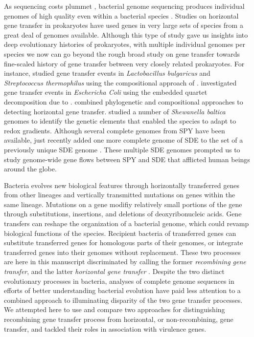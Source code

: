 \documentclass[english]{article}
\begin{document}
As sequencing costs plummet \citep{Mardis2011}, bacterial genome sequencing
produces individual genomes of high quality even within a bacterial species
\citep{Tettelin2009a}.  Studies on horizontal gene transfer in prokaryotes have
used genes in very large sets of species \citep{Koonin2001} from a great deal of
genomes available.  Although this type of study gave us insights into deep
evolutionary histories of prokaryotes, with multiple individual genomes per
species we now can go beyond the rough broad study on gene transfer towards
fine-scaled history of gene transfer between very closely related prokaryotes.
For instance, \citet{Liu2009} studied gene transfer events in
\textit{Lactobacillus bulgaricus} and \textit{Streptococcus thermophilus} using
the compositional approach of \citet{Karlin2001}. \citet{Luo2011} investigated
gene transfer events in \textit{Eschericha Coli} using the embedded quartet
decomposition due to \citet{Zhaxybayeva2006}.  \citet{Hamady2006} combined
phylogenetic and compositional approaches to detecting horizontal gene transfer.
\citet{Caro-Quintero2011} studied a number of \textit{Shewanella baltica}
genomes to identify the genetic elements that enabled the species to adapt to
redox gradients.  Although several complete genomes from SPY have been
available, \citet{Suzuki2011} just recently added one more complete genome of
SDE to the set of a previously unique SDE genome \citep{Shimomura2011}. These
multiple SDE genomes prompted us to study genome-wide gene flows between SPY and
SDE that afflicted human beings around the globe.

Bacteria evolves new biological features through horizontally transferred genes
from other lineages and vertically transmitted mutations on genes within the
same lineage.  Mutations on a gene modifiy relatively small portions of the gene
through substitutions, insertions, and deletions of deoxyribonucleic acids.
Gene transfers can reshape the organization of a bacterial genome,
which could revamp biological functions of the species.  Recipient bacteria of
transferred genes can substitute transferred genes for homologous parts of their
genomes, or integrate transferred genes into their genomes without replacement.
These two processes are here in this manuscript discriminated by calling the
former \textit{recombining gene transfer}, and the latter \textit{horizontal
gene transfer} \citep{Ochman2001,Lawrence2009}.  Despite the two distinct
evolutionary processes in bacteria, analyses of complete genome sequences in
efforts of better understanding bacterial evolution have paid less attention to
a combined approach to illuminating disparity of the two gene transfer
processes. We attempted here to use and compare two approaches for
distinguishing recombining gene transfer process from horizontal, or
non-recombining, gene transfer, and tackled their roles in association with
virulence genes.
\end{document}
